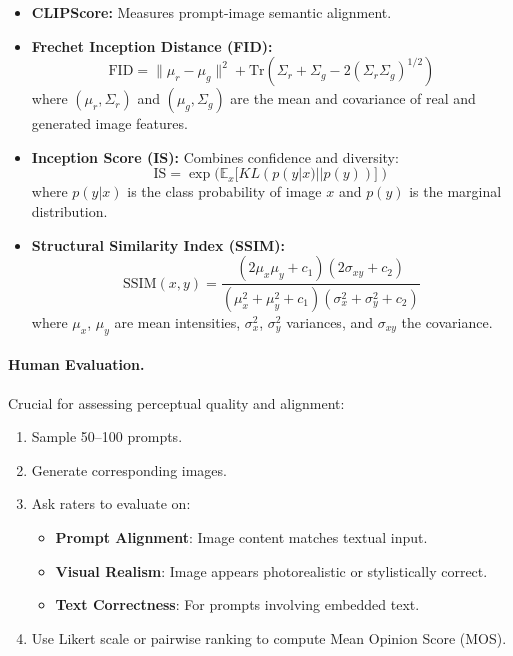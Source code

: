 \documentclass[conference]{IEEEtran}
\begin{document}
\begin{itemize}
	\item \textbf{CLIPScore:} Measures prompt-image semantic alignment.
	
	\item \textbf{Frechet Inception Distance (FID):}
	\begin{equation}
		\text{FID} = \|\mu_r - \mu_g\|^2 + \text{Tr}(\Sigma_r + \Sigma_g - 2(\Sigma_r \Sigma_g)^{1/2})
	\end{equation}
	where $(\mu_r, \Sigma_r)$ and $(\mu_g, \Sigma_g)$ are the mean and covariance of real and generated image features.
	
	\item \textbf{Inception Score (IS):} Combines confidence and diversity:
	\begin{equation}
		\text{IS} = \exp(\mathbb{E}_x[KL(p(y|x) || p(y))])
	\end{equation}
	where $p(y|x)$ is the class probability of image $x$ and $p(y)$ is the marginal distribution.
	
	\item \textbf{Structural Similarity Index (SSIM):}
	\begin{equation}
		\text{SSIM}(x, y) = \frac{(2\mu_x \mu_y + c_1)(2\sigma_{xy} + c_2)}{(\mu_x^2 + \mu_y^2 + c_1)(\sigma_x^2 + \sigma_y^2 + c_2)}
	\end{equation}
	where $\mu_x$, $\mu_y$ are mean intensities, $\sigma_x^2$, $\sigma_y^2$ variances, and $\sigma_{xy}$ the covariance.
	
\end{itemize}

\paragraph{Human Evaluation.} Crucial for assessing perceptual quality and alignment:

\begin{enumerate}
	\item Sample 50–100 prompts.
	\item Generate corresponding images.
	\item Ask raters to evaluate on:
	\begin{itemize}
		\item \textbf{Prompt Alignment}: Image content matches textual input.
		\item \textbf{Visual Realism}: Image appears photorealistic or stylistically correct.
		\item \textbf{Text Correctness}: For prompts involving embedded text.
	\end{itemize}
	\item Use Likert scale or pairwise ranking to compute Mean Opinion Score (MOS).
\end{enumerate}
\end{document}
